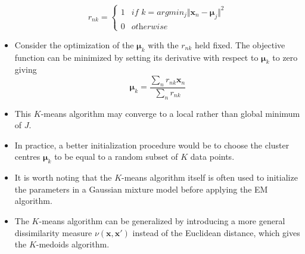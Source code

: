 \documentclass[12pt, a4paper]{article}
\begin{document}
\begin{itemize}
\begin{equation}
            r_{nk}=\begin{cases}
                1&\textit{if $k=argmin_j\Vert\bm{x}_n-\bm{\mu}_j\Vert^2$}\\
                0&\textit{otherwise}
            \end{cases}
        \end{equation}
        \item Consider the optimization of the $\bm{\mu}_k$ with the $r_{nk}$ held fixed.
        The objective function can be minimized by setting its derivative with respect to
        $\bm{\mu}_k$ to zero giving
        \begin{equation}
            \bm{\mu}_k=\frac{\sum_nr_{nk}\bm{x}_n}{\sum_nr_{nk}}
        \end{equation}
        \item This $K$-means algorithm may converge to a local rather than global 
        minimum of $J$.
        \item In practice, a better initialization procedure would be to choose the 
        cluster centres $\bm{\mu}_k$ to be equal to a random subset of $K$ data points.
        \item It is worth noting that the $K$-means algorithm itself is often used to 
        initialize the parameters in a Gaussian mixture model before applying the EM
        algorithm.
        \item The $K$-means algorithm can be generalized by introducing a more general
        dissimilarity measure $\nu(\bm{x},\bm{x}')$ instead of the Euclidean distance, 
        which gives the $K$-medoids algorithm.
    \end{itemize}
\end{document}
